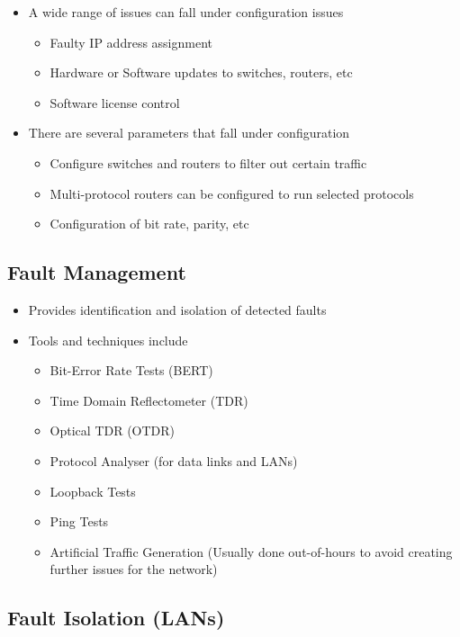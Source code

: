 \begin{itemize}
  \item A wide range of issues can fall under configuration issues
  \begin{itemize}
    \item Faulty IP address assignment
    \item Hardware or Software updates to switches, routers, etc
    \item Software license control
  \end{itemize}
  \item There are several parameters that fall under configuration
  \begin{itemize}
    \item Configure switches and routers to filter out certain traffic
    \item Multi-protocol routers can be configured to run selected protocols
    \item Configuration of bit rate, parity, etc
  \end{itemize}
\end{itemize}

\subsection*{Fault Management}

\begin{itemize}
  \item Provides identification and isolation of detected faults
  \item Tools and techniques include
  \begin{itemize}
    \item Bit-Error Rate Tests (BERT)
    \item Time Domain Reflectometer (TDR)
    \item Optical TDR (OTDR)
    \item Protocol Analyser (for data links and LANs)
    \item Loopback Tests
    \item Ping Tests
    \item Artificial Traffic Generation (Usually done out-of-hours to avoid creating further issues for the network)
  \end{itemize}
\end{itemize}

\subsection*{Fault Isolation (LANs)}

